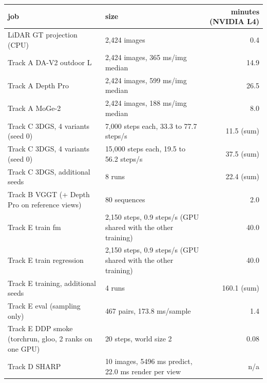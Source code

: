 \footnotesize\renewcommand{\arraystretch}{0.92}
\begin{tabular}{llr}
\toprule
job & size & minutes (NVIDIA L4) \\
\midrule
LiDAR GT projection (CPU) & 2,424 images & 0.4 \\
Track A DA-V2 outdoor L & 2,424 images, 365 ms/img median & 14.9 \\
Track A Depth Pro & 2,424 images, 599 ms/img median & 26.5 \\
Track A MoGe-2 & 2,424 images, 188 ms/img median & 8.0 \\
Track C 3DGS, 4 variants (seed 0) & 7,000 steps each, 33.3 to 77.7 steps/s & 11.5 (sum) \\
Track C 3DGS, 4 variants (seed 0) & 15,000 steps each, 19.5 to 56.2 steps/s & 37.5 (sum) \\
Track C 3DGS, additional seeds & 8 runs & 22.4 (sum) \\
Track B VGGT (+ Depth Pro on reference views) & 80 sequences & 2.0 \\
Track E train fm & 2,150 steps, 0.9 steps/s (GPU shared with the other training) & 40.0 \\
Track E train regression & 2,150 steps, 0.9 steps/s (GPU shared with the other training) & 40.0 \\
Track E training, additional seeds & 4 runs & 160.1 (sum) \\
Track E eval (sampling only) & 467 pairs, 173.8 ms/sample & 1.4 \\
Track E DDP smoke (torchrun, gloo, 2 ranks on one GPU) & 20 steps, world size 2 & 0.08 \\
Track D SHARP & 10 images, 5496 ms predict, 22.0 ms render per view & n/a \\
\bottomrule
\end{tabular}
